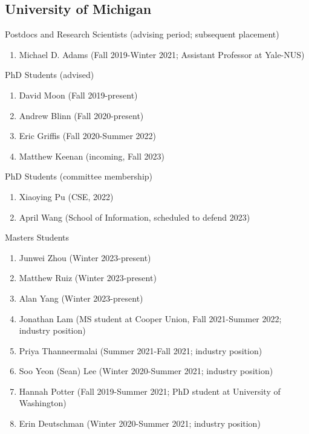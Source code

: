 \documentclass[10pt,letterpaper]{article}
\renewenvironment{itemize}{
  \begin{list}{}{
    \setlength{\leftmargin}{1.25em}
    \setlength{\itemsep}{0.25em}
    \setlength{\parskip}{0pt}
    \setlength{\parsep}{0.2em}
  }
}{
  \end{list}
}
\begin{document}
\subsection*{University of Michigan}
\begin{itemize}
  \item Postdocs and Research Scientists (advising period; subsequent placement)
        \begin{enumerate}
          \item Michael D. Adams (Fall 2019-Winter 2021; Assistant Professor at Yale-NUS)
        \end{enumerate}
  \item PhD Students (advised)
        \begin{enumerate}
          \item David Moon (Fall 2019-present)
          \item Andrew Blinn (Fall 2020-present)
          \item Eric Griffis (Fall 2020-Summer 2022)
          \item Matthew Keenan (incoming, Fall 2023)
        \end{enumerate}
  \item PhD Students (committee membership)
        \begin{enumerate}
          \item Xiaoying Pu (CSE, 2022)
          \item April Wang (School of Information, scheduled to defend 2023)
        \end{enumerate}
  \item Masters Students
        \begin{enumerate}
          \item Junwei Zhou (Winter 2023-present)
          \item Matthew Ruiz (Winter 2023-present)
          \item Alan Yang (Winter 2023-present)
          \item Jonathan Lam (MS student at Cooper Union, Fall 2021-Summer 2022; industry position)
          \item Priya Thanneermalai (Summer 2021-Fall 2021; industry position)
          \item Soo Yeon (Sean) Lee (Winter 2020-Summer 2021; industry position)
          \item Hannah Potter (Fall 2019-Summer 2021; PhD student at University of Washington)
          \item Erin Deutschman (Winter 2020-Summer 2021; industry position)

\end{enumerate}
\end{itemize}
\end{document}
